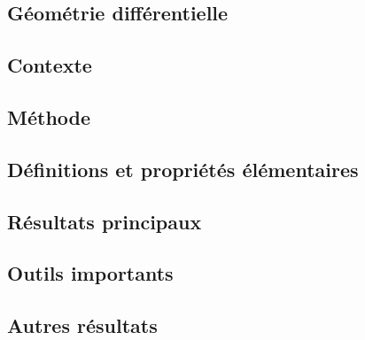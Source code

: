 \documentclass[11pt,a4paper]{article}
\begin{document}
\newpage
\begin{center}  
\section*{Géométrie différentielle} 
\end{center}


\subsection*{Contexte}

\subsection*{Méthode}

\subsection*{Définitions et propriétés élémentaires}

\subsection*{Résultats principaux}

\subsection*{Outils importants}


\subsection*{Autres résultats}
\end{document}
